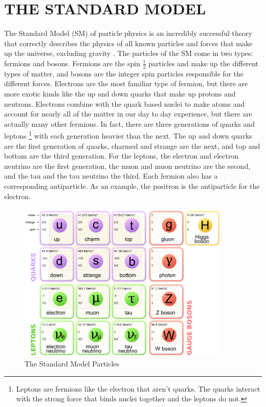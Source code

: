 \chapter{THE STANDARD MODEL} \label{sm}

The Standard Model (SM) of particle physics is an incredibly successful theory that correctly describes the physics of all known particles and forces that make up the universe, excluding gravity \cite{smconsistency}. The particles of the SM come in two types: fermions and bosons. Fermions are the spin $\frac{1}{2}$ particles and make up the different types of matter, and bosons are the integer spin particles responsible for the different forces. Electrons are the most familiar type of fermion, but there are more exotic kinds like the up and down quarks that make up protons and neutrons. Electrons combine with the quark based nuclei to make atoms and account for nearly all of the matter in our day to day experience, but there are actually many other fermions. In fact, there are three generations of quarks and leptons \footnote{Leptons are fermions like the electron that aren't quarks. The quarks interact with the strong force that binds nuclei together and the leptons do not.} with each generation heavier than the next. The up and down quarks are the first generation of quarks, charmed and strange are the next, and top and bottom are the third generation. For the leptons, the electron and electron neutrino are the first generation, the muon and muon neutrino are the second, and the tau and the tau neutrino the third. Each fermion also has a corresponding antiparticle. As an example, the positron is the antiparticle for the electron. 

\begin{figure}[h!]
  \centering
  \includegraphics[width=4in]{images/Standard_Model_of_Elementary_Particles.png}
  \caption
   {The Standard Model Particles}
  \label{fig:smtable}
\end{figure}

